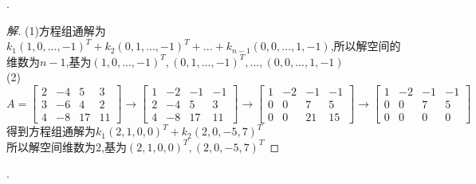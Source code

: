 \documentclass[10pt,a4paper]{report}
\begin{document}
.
\begin{proof}[解]
	(1)方程组通解为$k_{1}(1,0,...,-1)^{T}+k_{2}(0,1,...,-1)^{T}+...+k_{n-1}(0,0,...,1,-1)$,所以解空间的维数为$n-1$,基为$(1,0,...,-1)^{T},(0,1,...,-1)^{T},...,(0,0,...,1,-1)$\\
	(2)
	$A = \left[
	\begin{matrix}
	2 & -4 & 5 & 3\\
	3 & -6 & 4 & 2\\
	4 & -8 & 17 & 11
	\end{matrix}
	\right] \rightarrow \left[
	\begin{matrix}
	1 & -2 & -1 & -1\\
	2 & -4 & 5 & 3\\
	4 & -8 & 17 & 11
	\end{matrix}
	\right] \rightarrow \left[
	\begin{matrix}
	1 & -2 & -1 & -1\\
	0 & 0 & 7 & 5\\
	0 & 0 & 21 & 15
	\end{matrix}
	\right] \rightarrow \left[
	\begin{matrix}
	1 & -2 & -1 & -1\\
	0 & 0 & 7 & 5\\
	0 & 0 & 0 & 0
	\end{matrix}
	\right]$\\
	得到方程组通解为$k_{1}(2,1,0,0)^{T}+k_{2}(2,0,-5,7)^{T}$\\
	所以解空间维数为$2$,基为$(2,1,0,0)^{T}, (2,0,-5,7)^{T}$
\end{proof}
.
\end{document}
